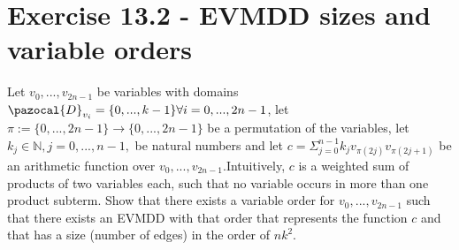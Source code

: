 \documentclass[11pt,a4paper]{article}
\begin{document}
\section*{Exercise 13.2 - EVMDD sizes and variable orders}

Let $v_0,...,v_{2n-1}$ be variables with domains $\pazocal{D}_{v_i} = \{0,...,k-1\} \forall i = 0,...,2n-1$,
let $\pi:=\{0,...,2n-1\} \rightarrow \{0,...,2n-1\}$ be a permutation of the variables,
let $k_j \in \mathbb{N}, j=0,...,n-1,$ be natural numbers and let
$c = \Sigma_{j=0}^{n-1}k_jv_{\pi(2j)}v_{\pi(2j+1)}$ be an arithmetic
function over $v_0,...,v_{2n-1}$.Intuitively, $c$ is a weighted sum 
of products of two variables each, such that no variable occurs in
more than one product subterm. Show that there exists a variable order 
for $v_0,...,v_{2n-1}$ such
that there exists an EVMDD with that order that represents the 
function $c$ and that has a size (number of edges) in the order 
of $nk^2$.\\
\end{document}
